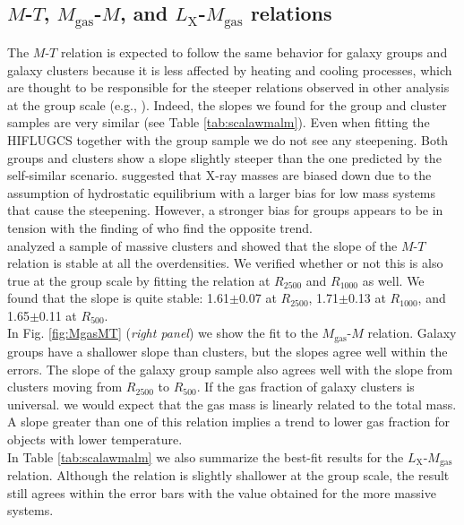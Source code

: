 \documentclass{aa} %
\begin{document}
\subsection{$M$-$T$, $M_{\text{gas}}$-$M$, and  $L_\text{X}$-$M_{\text{gas}}$ relations}
The $M$-$T$ relation is expected to follow the same behavior for
galaxy groups and galaxy clusters because it is less affected by heating and
cooling processes, which are thought to be responsible for the steeper relations observed in other analysis at the group scale (e.g., \citealt{2011A&A...535A.105E}). 
Indeed, the slopes we found for the group and cluster
samples are very similar (see Table
\ref{tab:scalawmalm}). Even when fitting the HIFLUGCS together with the group sample we
do not see any steepening. Both groups and clusters show a slope slightly steeper than the one predicted by the self-similar scenario. \citealt{2013ApJ...778...74K} suggested that X-ray masses are biased down due to the assumption of hydrostatic equilibrium with a larger bias for low mass systems that cause the steepening.  However, a stronger bias for groups appears to be in tension with the finding of \citealt{2014A&A...564A.129I} who find the opposite trend. \\
\cite{2005A&A...441..893A} analyzed a sample of massive clusters and
showed that the slope of the $M$-$T$ relation is stable at all the
overdensities. We verified whether or not this is also true at the
group scale by fitting the relation at $R_{2500}$ and
$R_{1000}$ as well. We found that the slope is quite
stable: 1.61$\pm$0.07 at $R_{2500}$, 1.71$\pm$0.13 at $R_{1000}$,
and 1.65$\pm$0.11 at $R_{500}$.\\
In Fig. \ref{fig:MgasMT} ({\it right panel}) we show the fit to the
$M_{\text{gas}}$-$M$ relation. Galaxy groups have a shallower slope than clusters, 
but the slopes agree well within the errors. 
The slope of the galaxy group sample also agrees well with the slope from clusters moving
from $R_{2500}$ to $R_{500}$.
If the gas fraction of galaxy clusters
is universal. we would expect that the gas mass is linearly
related to the total mass. A slope greater than one of this relation
implies a trend to lower gas fraction for objects with lower
temperature.\\
In Table \ref{tab:scalawmalm} we also summarize the best-fit results for the $L_\text{X}$-$M_{\text{gas}}$ relation. Although the relation is slightly shallower at the group scale, the result still agrees within the error bars with the value obtained for the more massive systems. 
\end{document}
